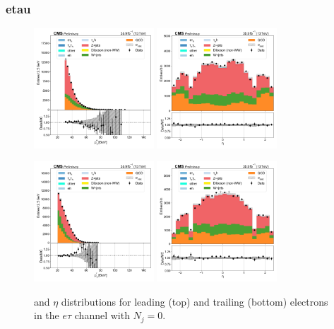 \subsubsection{etau}

\begin{figure}[htb!]
    \centering
    \includegraphics[width=0.4\textwidth]{chapters/Appendix/sectionPlots/figures/data_mc_overlays/etau_2016_cat_eq0_eq0_signal_linear_lepton_lepton1_pt}
    \includegraphics[width=0.4\textwidth]{chapters/Appendix/sectionPlots/figures/data_mc_overlays/etau_2016_cat_eq0_eq0_signal_linear_lepton_lepton1_eta}

    \includegraphics[width=0.4\textwidth]{chapters/Appendix/sectionPlots/figures/data_mc_overlays/etau_2016_cat_eq0_eq0_signal_linear_lepton_lepton2_pt}
    \includegraphics[width=0.4\textwidth]{chapters/Appendix/sectionPlots/figures/data_mc_overlays/etau_2016_cat_eq0_eq0_signal_linear_lepton_lepton2_eta}
    \caption{\pt and $\eta$ distributions for leading (top) and trailing
    (bottom) electrons in the $e\tau$ channel with $N_{j} = 0$.}
    \label{fig:etau_1_kinematic}
\end{figure}


